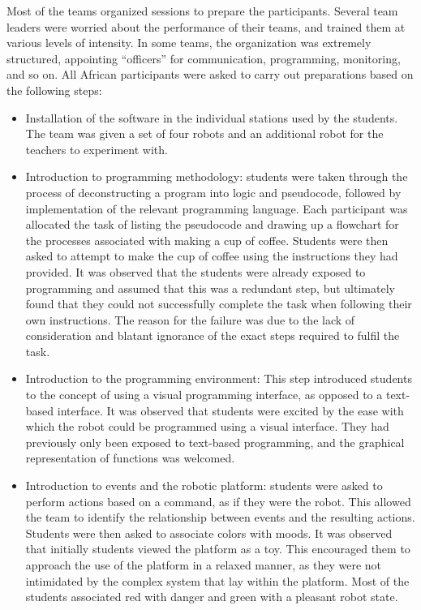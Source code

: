 \documentclass{intech-journal}
\begin{document}
Most of the teams organized sessions to prepare the participants.
Several team leaders were worried about the performance of their teams, and trained them at various levels of intensity.
In some teams, the organization was extremely structured, appointing ``officers'' for communication, programming, monitoring, and so on.
All African participants were asked to carry out preparations based on the following steps:
\begin{itemize}
\item Installation of the software in the individual stations used by the students. The team was given a set of four robots and an additional robot for the teachers to experiment with.
\item Introduction to programming methodology: students were taken through the process of deconstructing a program into logic and pseudocode, followed by implementation of the relevant programming language. 
Each participant was allocated the task of listing the pseudocode and drawing up a flowchart for the processes associated with making a cup of coffee. Students were then asked to attempt to make the cup of coffee using the instructions they had provided. 
It was observed that the students were already exposed to programming and assumed that this was a redundant step, but ultimately found that they could not successfully complete the task when following their own instructions. 
The reason for the failure was due to the lack of consideration and blatant ignorance of the exact steps required to fulfil the task.
\item Introduction to the programming environment: This step introduced students to the concept of using a visual programming interface, as opposed to a text-based interface.  
It was observed  that students were excited by the ease with which the robot could be programmed using a visual interface. 
They had previously only been exposed to text-based programming, and the graphical representation of functions was welcomed.
\item Introduction to events and the robotic platform: students were asked to perform actions based on a command, as if they were the robot. 
This allowed the team to identify the relationship between events and the resulting actions. 
Students were then asked to associate colors with moods. 
It was observed that initially students viewed the platform as a toy. 
This encouraged them to approach the use of the platform in a relaxed manner, as they were not intimidated by the complex system that lay within the platform. 
Most of the students associated red with danger and green with a pleasant robot state.

\end{itemize}
\end{document}
